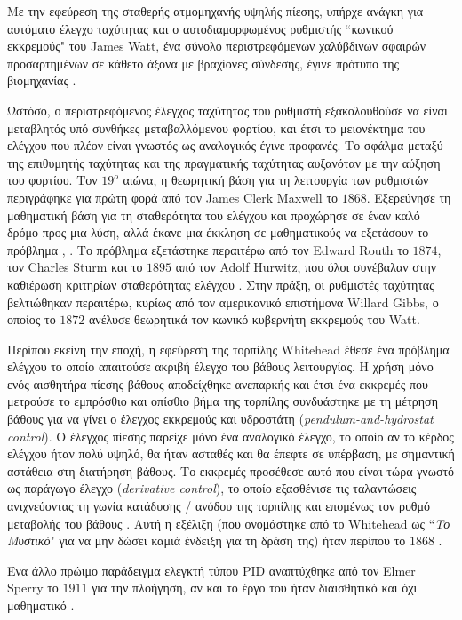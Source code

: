 Με την εφεύρεση της σταθερής ατμομηχανής υψηλής πίεσης, υπήρχε ανάγκη για αυτόματο έλεγχο ταχύτητας και ο αυτοδιαμορφωμένος ρυθμιστής ``κωνικού εκκρεμούς" του James Watt, ένα σύνολο περιστρεφόμενων χαλύβδινων σφαιρών προσαρτημένων σε κάθετο άξονα με βραχίονες σύνδεσης, έγινε πρότυπο της βιομηχανίας \cite{origin3}.

Ωστόσο, ο περιστρεφόμενος έλεγχος ταχύτητας του ρυθμιστή εξακολουθούσε να είναι μεταβλητός υπό συνθήκες μεταβαλλόμενου φορτίου, και έτσι το μειονέκτημα του ελέγχου που πλέον είναι γνωστός ως αναλογικός έγινε προφανές. Το σφάλμα μεταξύ της επιθυμητής ταχύτητας και της πραγματικής ταχύτητας αυξανόταν με την αύξηση του φορτίου. Τον $19^o$ αιώνα, η θεωρητική βάση για τη λειτουργία των ρυθμιστών περιγράφηκε για πρώτη φορά από τον James Clerk Maxwell το $1868$. Εξερεύνησε τη μαθηματική βάση για τη σταθερότητα του ελέγχου και προχώρησε σε έναν καλό δρόμο προς μια λύση, αλλά έκανε μια έκκληση σε μαθηματικούς να εξετάσουν το πρόβλημα \cite{origin3}, \cite{origin4}. Το πρόβλημα εξετάστηκε περαιτέρω από τον Edward Routh το $1874$, τον Charles Sturm και το $1895$ από τον Adolf Hurwitz, που όλοι συνέβαλαν στην καθιέρωση κριτηρίων σταθερότητας ελέγχου \cite{origin3}. Στην πράξη, οι ρυθμιστές ταχύτητας βελτιώθηκαν περαιτέρω, κυρίως από τον αμερικανικό επιστήμονα Willard Gibbs, ο οποίος το $1872$ ανέλυσε θεωρητικά τον κωνικό κυβερνήτη εκκρεμούς του Watt.

Περίπου εκείνη την εποχή, η εφεύρεση της τορπίλης Whitehead έθεσε ένα πρόβλημα ελέγχου το οποίο απαιτούσε ακριβή έλεγχο του βάθους λειτουργίας. Η χρήση μόνο ενός αισθητήρα πίεσης βάθους αποδείχθηκε ανεπαρκής και έτσι ένα εκκρεμές που μετρούσε το εμπρόσθιο και οπίσθιο βήμα της τορπίλης συνδυάστηκε με τη μέτρηση βάθους για να γίνει ο έλεγχος εκκρεμούς και υδροστάτη (\emph{pendulum-and-hydrostat control}). Ο έλεγχος πίεσης παρείχε μόνο ένα αναλογικό έλεγχο, το οποίο αν το κέρδος ελέγχου ήταν πολύ υψηλό, θα ήταν ασταθές και θα έπεφτε σε υπέρβαση, με σημαντική αστάθεια στη διατήρηση βάθους. Το εκκρεμές προσέθεσε αυτό που είναι τώρα γνωστό ως παράγωγο έλεγχο (\emph{derivative control}), το οποίο εξασθένισε τις ταλαντώσεις ανιχνεύοντας τη γωνία κατάδυσης / ανόδου της τορπίλης και επομένως τον ρυθμό μεταβολής του βάθους \cite{origin5}. Αυτή η εξέλιξη (που ονομάστηκε από το Whitehead ως ``\emph{Το Μυστικό}" για να μην δώσει καμιά ένδειξη για τη δράση της) ήταν περίπου το $1868$ \cite{origin6}.

Ένα άλλο πρώιμο παράδειγμα ελεγκτή τύπου PID αναπτύχθηκε από τον Elmer Sperry το $1911$ για την πλοήγηση, αν και το έργο του ήταν διαισθητικό και όχι μαθηματικό \cite{origin7}.

